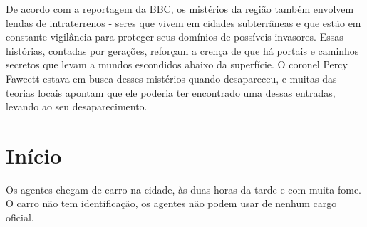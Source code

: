 De acordo com a reportagem da BBC, os mistérios da região também envolvem lendas de intraterrenos - seres que vivem em cidades subterrâneas e que estão em constante vigilância para proteger seus domínios de possíveis invasores. Essas histórias, contadas por gerações, reforçam a crença de que há portais e caminhos secretos que levam a mundos escondidos abaixo da superfície. O coronel Percy Fawcett estava em busca desses mistérios quando desapareceu, e muitas das teorias locais apontam que ele poderia ter encontrado uma dessas entradas, levando ao seu desaparecimento.


\section{Início}

Os agentes chegam de carro na cidade, às duas horas da tarde e com muita fome.
O carro não tem identificação, os agentes não podem usar de nenhum cargo oficial.

